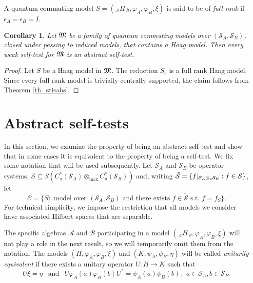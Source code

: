 \documentclass[11pt]{amsart}
\newtheorem{corollary}[theorem]{Corollary}
\theoremstyle{definition}
\newcommand\nph{\varphi}
\newcommand{\cl}[1]{\mathcal{#1}}
\begin{document}
A quantum commuting model 
$S = (_{\cl A}H_{\cl B}, \varphi_A, \varphi_B, \xi)$ is said to be of \emph{full rank}
if $\epsilon_A = \epsilon_B = I$. 

\begin{corollary}\label{c_red}
Let $\frak{M}$ be a family of quantum commuting models over $(\cl S_A,\cl S_B)$,
closed under passing to reduced models, that contains a Haag model. 
Then every weak self-test for $\frak{M}$ is an abstract self-test.
\end{corollary}

\begin{proof}
Let $S$ be a Haag model in $\frak{M}$. The reduction $S_r$ is a full rank Haag model.
Since every full rank model is trivially centrally supported, the claim 
follows from Theorem \ref{th_stisabs}. 
\end{proof}

\section{Abstract self-tests}\label{s_abstractselft}

In this section, we examine the property of being an 
abstract self-test and 
show that in some cases it is equivalent to the property of 
being a self-test. 
We fix some notation that will be used subsequently. 
Let $\cl S_A$ and $\cl S_B$ be operator systems, 
$\cl S \subseteq S(C^*_u(\cl S_A)\otimes_{\max} C^*_u(\cl S_B))$ 
and, writing $\tilde{\cl S} = \{f|_{\cl S_A\otimes_{\rm c} \cl S_B} : f\in \cl S\}$, let  
$$\cl C = \{S : \mbox{ model over } (\cl S_A,\cl S_B)
\mbox{ and there exists } f\in \tilde{\cl S} \mbox{ s.t. } f = f_S\}.$$
For technical simplicity, we impose the restriction that all models we consider 
have associated Hilbert spaces that are separable.


The specific algebras $\cl A$ and $\cl B$ participating in a model
$(\mbox{}_{\cl A}H_{\cl B}, \nph_A,\nph_B,\xi)$ will not play a role in the 
next result, so we will temporarily omit them from the notation. 
The models $(H,\nph_A,\nph_B,\xi)$ and $(K,\psi_A,\psi_B,\eta)$
will be called \emph{unitarily equivalent} if there exists a unitary 
operator $U : H\to K$ such that 
$$U\xi = \eta \ \ \mbox{ and } \ \ U\nph_A(a)\nph_B(b)U^* = \psi_A(a)\psi_B(b), 
\ \  a\in \cl S_A, b\in \cl S_B.$$
\end{document}
